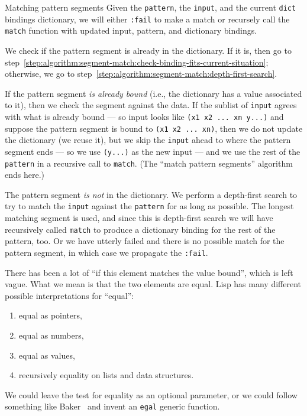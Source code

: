 \begin{algorithm}{Matching pattern segments}
Given the \lstinline[language=lisp]{pattern},
the \lstinline[language=lisp]{input}, and the current
\lstinline[language=lisp]{dict} bindings dictionary, we will either
\lstinline[language=lisp]{:fail} to make a match or recursely call the
\lstinline[language=lisp]{match} function with updated input, pattern,
and dictionary bindings.

We check if the pattern segment is already in the dictionary. If it is,
then go to step~\ref{step:algorithm:segment-match:check-binding-fits-current-situation}; otherwise, we go to step~\ref{step:algorithm:segment-match:depth-first-search}.

\label{step:algorithm:segment-match:check-binding-fits-current-situation}
If the pattern segment \emph{is already bound} (i.e., the dictionary has
a value associated to it), then we check the segment against the data.
If the sublist of \lstinline[language=lisp]{input} agrees with what is
already bound --- so input looks like \lstinline[language=lisp]{(x1 x2 ... xn y...)}
and suppose the pattern segment is bound to \lstinline[language=lisp]{(x1 x2 ... xn)}, then we
do not update the dictionary (we reuse it),
but we skip the \lstinline[language=lisp]{input} ahead to where the
pattern segment ends --- so we use \lstinline[language=lisp]{(y...)} as
the new input --- and we use the rest of the
\lstinline[language=lisp]{pattern} in a recursive call to
\lstinline[language=lisp]{match}. (The ``match pattern segments''
algorithm ends here.)

\label{step:algorithm:segment-match:depth-first-search}
The pattern segment \emph{is not} in the dictionary. We perform a
depth-first search to try to match the \lstinline[language=lisp]{input}
against the \lstinline[language=lisp]{pattern} for as long as possible.
The longest matching segment is used, and since this is depth-first
search we will have recursively called \lstinline[language=lisp]{match}
to produce a dictionary binding for the rest of the pattern, too.
Or we have utterly failed and there is no possible match for the pattern
segment, in which case we propagate the \lstinline[language=lisp]{:fail}.\quad\qedsymbol
\end{algorithm}

There has been a lot of ``if this element matches the value bound'',
which is left vague. What we mean is that the two elements are equal.
Lisp has many different possible interpretations for ``equal'':
\begin{enumerate}
\item equal as pointers,
\item equal as numbers,
\item equal as values,
\item recursively equality on lists and data structures.
\end{enumerate}
We could leave the test for equality as an optional parameter, or we
could follow something like Baker~\cite{baker1993equal} and invent an
\lstinline[language=lisp]{egal} generic function.

